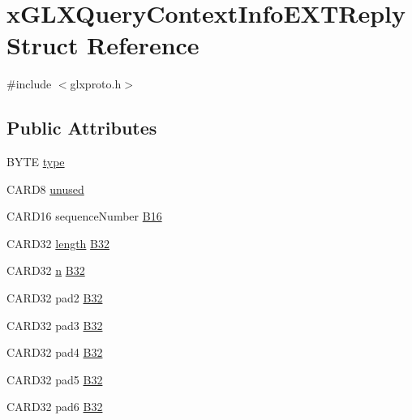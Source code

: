 \hypertarget{structx_g_l_x_query_context_info_e_x_t_reply}{}\section{x\+G\+L\+X\+Query\+Context\+Info\+E\+X\+T\+Reply Struct Reference}
\label{structx_g_l_x_query_context_info_e_x_t_reply}


{\ttfamily \#include $<$glxproto.\+h$>$}

\subsection*{Public Attributes}
\begin{DoxyCompactItemize}
\item 
B\+Y\+TE \hyperlink{structx_g_l_x_query_context_info_e_x_t_reply_a124b1f892330a2bdfae802dff3972252}{type}
\item 
C\+A\+R\+D8 \hyperlink{structx_g_l_x_query_context_info_e_x_t_reply_aa57ce183f860c9140916768fc9515542}{unused}
\item 
C\+A\+R\+D16 sequence\+Number \hyperlink{structx_g_l_x_query_context_info_e_x_t_reply_a21cd1ce7f105e4767e668537570cb1b5}{B16}
\item 
C\+A\+R\+D32 \hyperlink{glcorearb_8h_ab9c919755bde3b34349e23a32b4e0fa7}{length} \hyperlink{structx_g_l_x_query_context_info_e_x_t_reply_a143efe9316246bb9d64594f4a5fb8785}{B32}
\item 
C\+A\+R\+D32 \hyperlink{glcorearb_8h_ae2b4646468bc89d0ba646f5cf838e051}{n} \hyperlink{structx_g_l_x_query_context_info_e_x_t_reply_a089e1881f6326daabe740a6c2ffa0c67}{B32}
\item 
C\+A\+R\+D32 pad2 \hyperlink{structx_g_l_x_query_context_info_e_x_t_reply_a6c7682fe0ff18e630b8ed2de9fb3240c}{B32}
\item 
C\+A\+R\+D32 pad3 \hyperlink{structx_g_l_x_query_context_info_e_x_t_reply_a1fbb1c03fbf192858524fe6442e02eb9}{B32}
\item 
C\+A\+R\+D32 pad4 \hyperlink{structx_g_l_x_query_context_info_e_x_t_reply_aaba3b65b0364574d138296b76cf5511d}{B32}
\item 
C\+A\+R\+D32 pad5 \hyperlink{structx_g_l_x_query_context_info_e_x_t_reply_a10052e9dcfa8ceaa26348e4cc1081c9c}{B32}
\item 
C\+A\+R\+D32 pad6 \hyperlink{structx_g_l_x_query_context_info_e_x_t_reply_a02aacce8fbdedd7a348b3ed39f525def}{B32}
\end{DoxyCompactItemize}



